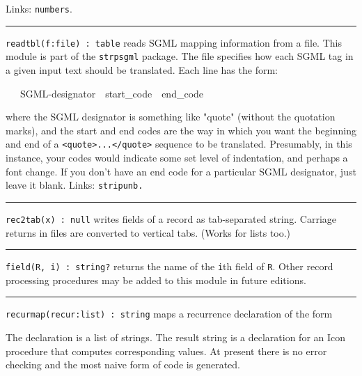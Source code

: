 Links: \texttt{numbers}. 

\vspace{0.25cm}\hrule{}

\texttt{readtbl(f:file) : table} reads SGML mapping
information from a file. This module is part of the \texttt{strpsgml}
package. The file specifies how each SGML tag in a given input text
should be translated. Each line has the form:

\ \ \ SGML-designator\ \ start\_code\ \ end\_code

where the SGML designator is something like
"quote" (without the quotation marks), and
the start and end codes are the way in which you want the beginning and
end of a
\texttt{{\textless}quote{\textgreater}...{\textless}/quote{\textgreater}}
sequence to be translated. Presumably, in this instance, your codes
would indicate some set level of indentation, and perhaps a font
change. If you don't have an end code for a particular
SGML designator, just leave it blank.
Links: \texttt{stripunb.}

\vspace{0.25cm}\hrule{}

\texttt{rec2tab(x) : null} writes fields of a record as tab-separated
string. Carriage returns in files are converted to vertical tabs.
(Works for lists too.) \ 

\vspace{0.25cm}\hrule{}

\texttt{field(R, i) : string?} returns the name of the \texttt{i}th
field of \texttt{R}. Other record processing procedures may be added to
this module in future editions. 

\vspace{0.25cm}\hrule{}

\texttt{recurmap(recur:list) : string} maps a recurrence declaration of
the form

The declaration is a list of strings. The result string is a
declaration for an Icon procedure that computes corresponding values.
At present there is no error checking and the most naive form of code
is generated. 


